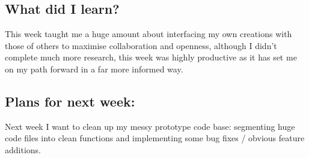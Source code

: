 \subsection*{What did I learn?}
This week taught me a huge amount about interfacing my own creations with those of others to maximise collaboration and openness, although I didn't complete much more research, this week was highly productive as it has set me on my path forward in a far more informed way.


\subsection*{Plans for next week:} 
Next week I want to clean up my messy prototype code base: segmenting huge code files into clean functions and implementing some bug fixes / obvious feature additions.
